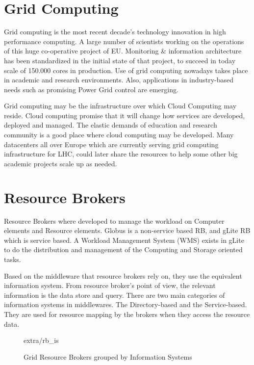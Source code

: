 \section{Grid Computing}
Grid computing \cite{li2005grid} is the most recent decade's technology innovation in high performance computing. A large number of scientists working on the operations of this huge co-operative project of EU. Monitoring \& information architecture \cite{fisher2002datagrid} has been standardized in the initial state of that project, to succeed in today scale of 150.000 cores in production. Use of grid computing nowadays takes place in academic and research environments. Also, applications in industry-based needs such as promising Power Grid control \cite{Taylor2006} are emerging.

Grid computing may be the infrastructure over which Cloud Computing may reside. Cloud computing promise that it will change how services are developed, deployed and managed. The elastic demands of education and research community is a good place where cloud computing may be developed. Many datacenters all over Europe which are currently serving grid computing infrastructure for LHC, could later share the resources to help some other big academic projects scale up as needed.

\section{Resource Brokers}
Resource Brokers \cite{Kertesz06ataxonomy} where developed to manage the workload on Computer elements and Resource elements. Globus is a non-service based RB, and gLite RB which is service based. A Workload Management System (WMS) exists in gLite to do the distribution and management of the Computing and Storage oriented tasks.

Based on the middleware that resource brokers rely on, they use the equivalent information system. From resource broker's point of view, the relevant information is the data store and query. There are two main categories of information systems in middlewares. The Directory-based and the Service-based. They are used for resource mapping by the brokers when they access the resource data.

\begin{figure}[h]
\begin{center}
 {extra/rb_is}
\caption{Grid Resource Brokers grouped by Information Systems\cite{Kertesz06ataxonomy}}
\end{center}
\end{figure}

